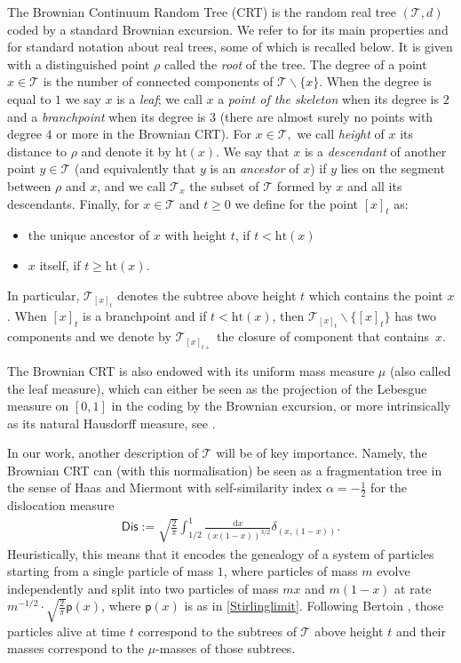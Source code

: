\documentclass[11pt]{article}
\newcommand{\pp}{\mathsf{p}}
\newcommand{\T}{\mathcal{T}}
\renewcommand{\geq}{\geqslant}
\newcommand{\h}{\mathrm{ht}}
\begin{document}
The Brownian Continuum Random Tree (CRT) is the random real tree $( \mathcal{T}, d)$ coded by a standard Brownian excursion. We refer to \cite{LG2005} for its main properties and for standard notation about real trees, some of which is recalled below. It is given with a distinguished point $ \rho$ called the  \emph{root} of the tree. The degree of a point $x \in \mathcal{T}$ is the number of connected components of $\T\backslash \{x\}$. When the degree is equal to $1$ we say $x$ is a \emph{leaf}; we call $x$ a \emph{point of the skeleton} when its degree is $2$ and a \emph{branchpoint} when its degree is $3$ (there are almost surely no points with degree $4$ or more in the Brownian CRT). For $x\in \T,$ we call \emph{height} of $x$ its distance to $\rho$ and denote it by $\h(x)$. We say that $x$ is a \emph{descendant} of another point $y\in\T$ (and equivalently that $y$ is an \emph{ancestor} of $x$) if $y$ lies on the segment between $\rho$ and $x$, and we call $\T_x$ the subset of $\T$ formed by $x$ and all its descendants. Finally, for $x \in \T$ and $t\geq 0$ we define for the point $[x]_t$  as:
\begin{itemize}
    \item the unique ancestor of $x$ with height $t$, if $t< \h(x)$
    \item $x$ itself, if $t\geq \h(x).$
\end{itemize}
In particular, $ \T_{[x]_t}$ denotes the subtree above height $t$ which contains the point $x$. When $[x]_t$ is a branchpoint and if $t < \h(x)$, then $\T_{[x]_t} \backslash \{[x]_t\}$ has two components and we denote by $ \mathcal{T}_{[x]_{t+}}$ the closure of component that contains~$x$.

The Brownian CRT is also endowed with its uniform mass measure $\mu$ (also called the leaf measure), which can either be seen as the projection of the Lebesgue measure on $[0,1]$ in the coding by the Brownian excursion, or more intrinsically as its natural Hausdorff measure, see \cite{duquesne2005probabilistic,duquesne2006hausdorff}. 

In our work, another description of $\mathcal{T}$ will be of key importance. Namely, the Brownian CRT can (with this normalisation) be seen as a fragmentation tree in the sense of Haas and Miermont \cite{HM04} with self-similarity index $\alpha = - \frac{1}{2}$ for the dislocation measure 
\begin{eqnarray}
    \label{eq:Dislocation}
 \mathsf{Dis} := \sqrt{\frac{2}{\pi}} \int_{1/2}^{1} \frac{ \mathrm{d}x}{(x(1-x))^{3/2}} \delta_{(x,(1-x))}.
 \end{eqnarray}
Heuristically, this means that it encodes the genealogy of a system of particles starting from a single particle of mass $1$, where particles of mass $m$ evolve independently and split into two particles of mass $mx$ and $m(1-x)$ at rate $m^{-1/2} \cdot \sqrt{\frac{2}{\pi}} \pp(x)$, where $\pp(x)$ is as in \eqref{Stirlinglimit}. Following Bertoin \cite{bertoin2002self}, those particles alive at time $t$ correspond to the subtrees of $\T$ above height $t$ and their masses correspond to the $\mu$-masses of those subtrees.
\end{document}
